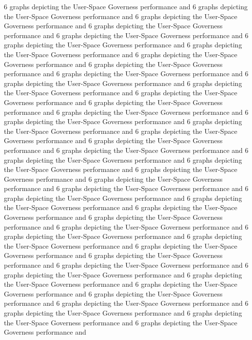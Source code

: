 6 graphs depicting the User-Space Governess performance and 
6 graphs depicting the User-Space Governess performance and 
6 graphs depicting the User-Space Governess performance and 
6 graphs depicting the User-Space Governess performance and 
6 graphs depicting the User-Space Governess performance and 
6 graphs depicting the User-Space Governess performance and 
6 graphs depicting the User-Space Governess performance and 
6 graphs depicting the User-Space Governess performance and 
6 graphs depicting the User-Space Governess performance and 
6 graphs depicting the User-Space Governess performance and 
6 graphs depicting the User-Space Governess performance and 
6 graphs depicting the User-Space Governess performance and 
6 graphs depicting the User-Space Governess performance and 
6 graphs depicting the User-Space Governess performance and 
6 graphs depicting the User-Space Governess performance and 
6 graphs depicting the User-Space Governess performance and 
6 graphs depicting the User-Space Governess performance and 
6 graphs depicting the User-Space Governess performance and 
6 graphs depicting the User-Space Governess performance and 
6 graphs depicting the User-Space Governess performance and 
6 graphs depicting the User-Space Governess performance and 
6 graphs depicting the User-Space Governess performance and 
6 graphs depicting the User-Space Governess performance and 
6 graphs depicting the User-Space Governess performance and 
6 graphs depicting the User-Space Governess performance and 
6 graphs depicting the User-Space Governess performance and 
6 graphs depicting the User-Space Governess performance and 
6 graphs depicting the User-Space Governess performance and 
6 graphs depicting the User-Space Governess performance and 
6 graphs depicting the User-Space Governess performance and 
6 graphs depicting the User-Space Governess performance and 
6 graphs depicting the User-Space Governess performance and 
6 graphs depicting the User-Space Governess performance and 
6 graphs depicting the User-Space Governess performance and 
6 graphs depicting the User-Space Governess performance and 
6 graphs depicting the User-Space Governess performance and 
6 graphs depicting the User-Space Governess performance and 
6 graphs depicting the User-Space Governess performance and 
6 graphs depicting the User-Space Governess performance and 
6 graphs depicting the User-Space Governess performance and 
6 graphs depicting the User-Space Governess performance and 
6 graphs depicting the User-Space Governess performance and 
6 graphs depicting the User-Space Governess performance and 
